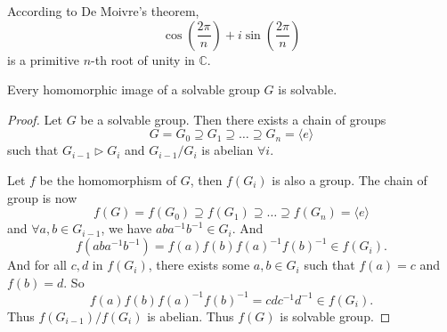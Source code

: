 \begin{example}
    According to De Moivre's theorem,
    \[
        \cos \left(\frac{2 \pi}{n}\right) + i \sin \left(\frac{2 \pi}{n}\right)
    \]
    is a primitive $n$-th root of unity in $\mathbb{C}$.
\end{example}

\begin{theorem}
    Every homomorphic image of a solvable group $G$ is solvable.
\end{theorem}
\begin{proof}
    Let $G$ be a solvable group. Then there exists a chain of groups
    \[
        G = G_0 \supseteq G_1 \supseteq \ldots \supseteq G_n = \langle  e \rangle
    \]
    such that $G_{i-1} \triangleright G_i$ and $G_{i-1} / G_i$ is abelian $\forall i$.

    Let $f$ be the homomorphism of $G$, then $f(G_i)$ is also a group. The chain of group is now 
    \[
        f(G) = f(G_0) \supseteq f(G_1) \supseteq \ldots \supseteq f(G_n) = \langle  e \rangle
    \]
    and $\forall a, b \in G_{i-1}$, we have $aba^{-1}b^{-1} \in G_i$. And 
    \[
        f(aba^{-1}b^{-1}) = f(a)f(b)f(a)^{-1}f(b)^{-1} \in f(G_i).
    \]
    And for all $c, d$ in $f(G_i)$, there exists some $a, b \in G_i$ such that $f(a) = c$ and 
    $f(b) = d$. So 
    \[
        f(a)f(b)f(a)^{-1}f(b)^{-1} = cdc^{-1}d^{-1} \in f(G_i).
    \]
    Thus $f(G_{i-1})/f(G_i)$ is abelian. Thus $f(G)$ is solvable group.
\end{proof}